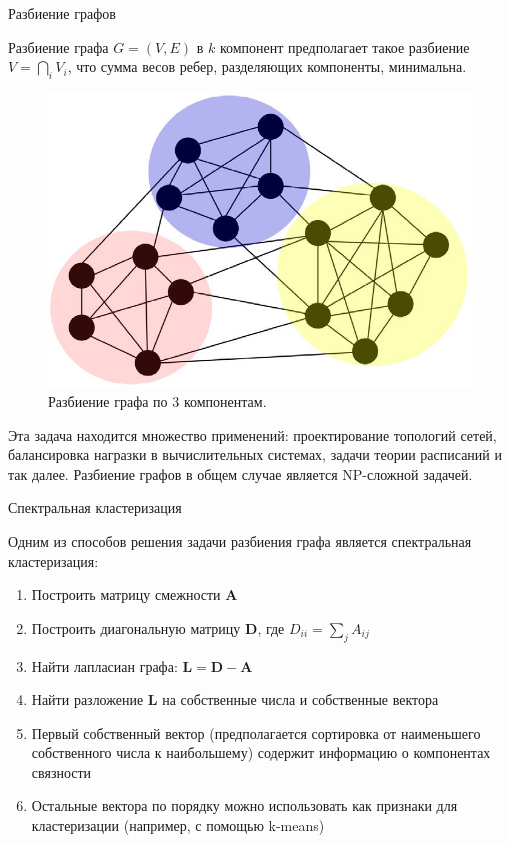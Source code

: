 \documentclass{beamer}
\begin{document}
\begin{frame}{Разбиение графов}
    \small

    \begin{minipage}{0.49\textwidth}
        Разбиение графа $G = (V, E)$ в $k$ компонент предполагает такое разбиение $V = \bigcap_i V_i$, что сумма весов ребер, разделяющих компоненты, минимальна.
    \end{minipage}
    \begin{minipage}{0.49\textwidth}
        \begin{figure}
            \centering
            \includegraphics[width=1.0\textwidth]{images/graph_partitioning.png}
            \caption{Разбиение графа по 3 компонентам.}
        \end{figure}
    \end{minipage}

    Эта задача находится множество применений: проектирование топологий сетей, балансировка награзки в вычислительных системах, задачи теории расписаний и так далее.
    Разбиение графов в общем случае является NP-сложной задачей.
\end{frame}

\begin{frame}{Спектральная кластеризация}
    \small

    Одним из способов решения задачи разбиения графа является спектральная кластеризация:

    \begin{enumerate}
        \item Построить матрицу смежности $\bm{A}$
        \item Построить диагональную матрицу $\bm{D}$, где $D_{ii} = \sum_j A_{ij}$
        \item Найти лапласиан графа: $\bm{L} = \bm{D} - \bm{A}$
        \item Найти разложение $\bm{L}$ на собственные числа и собственные вектора
        \item Первый собственный вектор (предполагается сортировка от наименьшего собственного числа к наибольшему) содержит информацию о компонентах связности
        \item Остальные вектора по порядку можно использовать как признаки для кластеризации (например, с помощью k-means) 
    \end{enumerate}
\end{frame}
\end{document}
